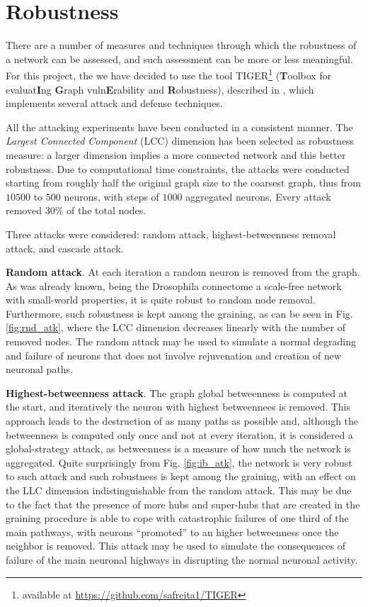 \section{Robustness}
There are a number of measures and techniques through which the robustness of a network can be assessed, and such assessment can be more or less meaningful. For this project, the we have decided to use the tool TIGER\footnote{available at \href{https://github.com/safreita1/TIGER}{https://github.com/safreita1/TIGER}} (\textbf{T}oolbox for evaluat\textbf{I}ng \textbf{G}raph vuln\textbf{E}rability and \textbf{R}obustness), described in \cite{freitas2020tiger}, which implements several attack and defense techniques.

All the attacking experiments have been conducted in a consistent manner. The \textit{Largest Connected Component} (LCC) dimension has been selected as robustness measure: a larger dimension implies a more connected network and this better robustness. Due to computational time constraints, the attacks were conducted starting from roughly half the original graph size to the coarsest graph, thus from $10500$ to $500$ neurons, with steps of $1000$ aggregated neurons. Every attack removed 30\% of the total nodes.

Three attacks were considered: random attack, highest-betweenness removal attack, and cascade attack.

\vspace{\baselineskip}
\noindent \textbf{Random attack}. At each iteration a random neuron is removed from the graph. As was already known, being the Drosophila connectome a scale-free network with small-world properties, it is quite robust to random node removal. Furthermore, such robustness is kept among the graining, as can be seen in Fig. \ref{fig:rnd_atk}, where the LCC dimension decreases linearly with the number of removed nodes. 
\newline The random attack may be used to simulate a normal degrading and failure of neurons that does not  involve rejuvenation and creation of new neuronal paths. 

\vspace{\baselineskip}
\noindent \textbf{Highest-betweenness attack}. The graph global betweenness is computed at the start, and iteratively the neuron with highest betweennees is removed. This approach leads to the destruction of as many paths as possible and, although the betweenness is computed only once and not at every iteration, it is considered a global-strategy attack, as betweenness is a measure of how much the network is aggregated. Quite surprisingly from Fig. \ref{fig:ib_atk}, the network is very robust to such attack and such robustness is kept among the graining, with an effect on the LLC dimension indistinguishable from the random attack. This may be due to the fact that the presence of more hubs and super-hubs that are created in the graining procedure is able to cope with catastrophic failures of one third of the main pathways, with neurons ``promoted'' to an higher betweenness once the neighbor is removed.
\newline This attack may be used to simulate the consequences of failure of the main neuronal highways in disrupting the normal neuronal activity.
	
